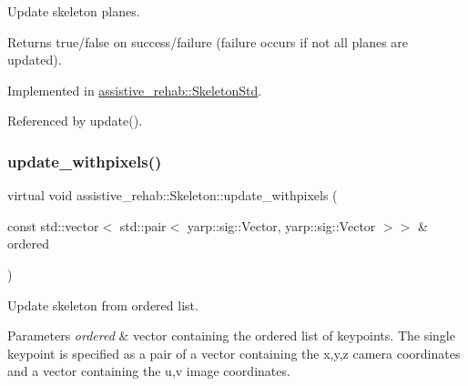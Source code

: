 Update skeleton planes. 

\begin{DoxyReturn}{Returns}
true/false on success/failure (failure occurs if not all planes are updated). 
\end{DoxyReturn}


Implemented in \mbox{\hyperlink{classassistive__rehab_1_1SkeletonStd_a5769bc6fd407118c866b57b869d672ca}{assistive\+\_\+rehab\+::\+Skeleton\+Std}}.



Referenced by update().

\mbox{\label{classassistive__rehab_1_1Skeleton_a20d9eb5aecd6dccfa7e049bb932a6cef}} 
\subsubsection{\texorpdfstring{update\_withpixels()}{update\_withpixels()}\hspace{0.1cm}{\footnotesize\ttfamily [1/2]}}
{\footnotesize\ttfamily virtual void assistive\+\_\+rehab\+::\+Skeleton\+::update\+\_\+withpixels (\begin{DoxyParamCaption}\item[{const std\+::vector$<$ std\+::pair$<$ yarp\+::sig\+::\+Vector, yarp\+::sig\+::\+Vector $>$$>$ \&}]{ordered }\end{DoxyParamCaption})\hspace{0.3cm}{\ttfamily [virtual]}}



Update skeleton from ordered list. 


\begin{DoxyParams}{Parameters}
{\em ordered} & vector containing the ordered list of keypoints. The single keypoint is specified as a pair of a vector containing the x,y,z camera coordinates and a vector containing the u,v image coordinates. \\
\hline
\end{DoxyParams}
\mbox{\label{classassistive__rehab_1_1Skeleton_a36e9dfd4910120025e40ccc3d03c0e01}} 
